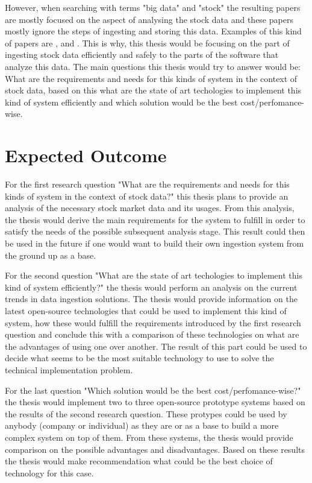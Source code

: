 \documentclass[article,11pt]{article}
\begin{document}
However, when searching with terms "big data" and "stock" the resulting papers are mostly focused on the aspect of analysing the stock data and these papers mostly ignore the steps of ingesting and storing this data. Examples of this kind of papers are \cite{wu}, \cite{aghakhani} and \cite{kao}. This is why, this thesis would be focusing on the part of ingesting stock data efficiently and safely to the parts of the software that analyze this data. The main questions this thesis would try to answer would be: What are the requirements and needs for this kinds of system in the context of stock data, based on this what are the state of art techologies to implement this kind of system efficiently and which solution would be the best cost/perfomance-wise.

\section{Expected Outcome}

For the first research question "What are the requirements and needs for this kinds of system in the context of stock data?" this thesis plans to provide an analysis of the necessary stock market data and its usages. From this analysis, the thesis would derive the main requirements for the system to fulfill in order to satisfy the needs of the possible subsequent analysis stage. This result could then be used in the future if one would want to build their own ingestion system from the ground up as a base.

For the second question "What are the state of art techologies to implement this kind of system efficiently?" the thesis would perform an analysis on the current trends in data ingestion solutions. The thesis would provide information on the latest open-source technologies that could be used to implement this kind of system, how these would fulfill the requirements introduced by the first research question and conclude this with a comparison of these technologies on what are the advantages of using one over another. The result of this part could be used to decide what seems to be the most suitable technology to use to solve the technical implementation problem.

For the last question "Which solution would be the best cost/perfomance-wise?" the thesis would implement two to three open-source prototype systems based on the results of the second research question. These protypes could be used by anybody (company or individual) as they are or as a base to build a more complex system on top of them. From these systems, the thesis would provide comparison on the possible advantages and disadvantages. Based on these results the thesis would make recommendation what could be the best choice of technology for this case.
\end{document}
